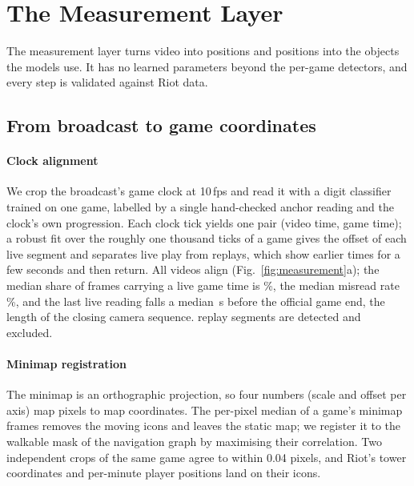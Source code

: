\section{The Measurement Layer}
\label{sec:measurement}

The measurement layer turns video into positions and positions into the objects the models use.
It has no learned parameters beyond the per-game detectors, and every step is validated against Riot data.

\subsection{From broadcast to game coordinates}

\paragraph*{Clock alignment}
We crop the broadcast's game clock at 10\,fps and read it with a digit classifier trained on one game, labelled by a single hand-checked anchor reading and the clock's own progression.
Each clock tick yields one pair (video time, game time); a robust fit over the roughly one thousand ticks of a game gives the offset of each live segment and separates live play from replays, which show earlier times for a few seconds and then return.
All  videos align (Fig.~\ref{fig:measurement}a); the median share of frames carrying a live game time is \%, the median misread rate \%, and the last live reading falls a median \,s before the official game end, the length of the closing camera sequence.
 replay segments are detected and excluded.

\paragraph*{Minimap registration}
The minimap is an orthographic projection, so four numbers (scale and offset per axis) map pixels to map coordinates.
The per-pixel median of a game's minimap frames removes the moving icons and leaves the static map; we register it to the walkable mask of the navigation graph by maximising their correlation.
Two independent crops of the same game agree to within 0.04 pixels, and Riot's tower coordinates and per-minute player positions land on their icons.

